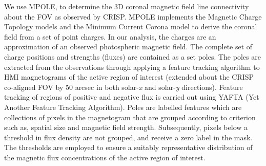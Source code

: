 	We use MPOLE, to determine the 3D coronal magnetic field line connectivity about the FOV as observed by CRISP. MPOLE implements the Magnetic Charge Topology models and the Minimum Current Corona model  to derive the coronal field from a set of point charges. In our analysis, the charges are an approximation of an observed photospheric magnetic field. The complete set of charge positions and strengths (fluxes) are contained as a set poles. The poles are extracted from the observations through applying a feature tracking algorithm to HMI magnetograms of the active region of interest (extended about the CRISP co-aligned FOV by 50 arcsec in both solar-\textit{x} and solar-\textit{y} directions). Feature tracking of regions of positive and negative flux is carried out using YAFTA (Yet Another Feature Tracking Algorithm)\citep{DeForest2007}. Poles are labelled features which are collections of pixels in the magnetogram that are grouped according to criterion such as, spatial size and magnetic field strength. Subsequently, pixels below a threshold in flux density are not grouped, and receive a zero label in the mask. The thresholds are employed to ensure a suitably representative distribution of the  magnetic flux concentrations of the active region of interest.

